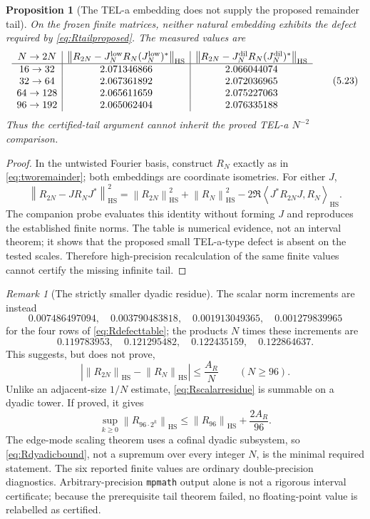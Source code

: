 \documentclass[11pt]{article}
\newtheorem{proposition}[theorem]{Proposition}
\theoremstyle{remark}
\newtheorem{remark}[theorem]{Remark}
\newcommand{\HS}{\mathrm{HS}}
\newcommand{\norm}[1]{\left\lVert#1\right\rVert}
\newcommand{\ip}[2]{\left\langle#1,#2\right\rangle}
\begin{document}
\begin{proposition}[The TEL-a embedding does not supply the proposed
remainder tail]\label{prop:tailfailure}
On the frozen finite matrices, neither natural embedding exhibits the
defect required by \eqref{eq:Rtailproposed}.  The measured values are
\[
\begin{array}{c|c|c}
N\to2N&
\norm{R_{2N}-J_N^{\rm low}R_N(J_N^{\rm low})^*}_{\HS}&
\norm{R_{2N}-J_N^{\rm dil}R_N(J_N^{\rm dil})^*}_{\HS}\\ \hline
16\to32&2.071346866&2.066044074\\
32\to64&2.067361892&2.072036965\\
64\to128&2.065611659&2.075227063\\
96\to192&2.065062404&2.076335188
\end{array}
\tag{5.23}\label{eq:Rdefecttable}
\]
Thus the certified-tail argument cannot inherit the proved TEL-a
$N^{-2}$ comparison.
\end{proposition}

\begin{proof}
In the untwisted Fourier basis, construct $R_N$ exactly as in
\eqref{eq:tworemainder}; both embeddings are coordinate isometries.
For either $J$,
\[
 \norm{R_{2N}-JR_NJ^*}_{\HS}^2
 =\norm{R_{2N}}_{\HS}^2+\norm{R_N}_{\HS}^2
 -2\Re\ip{J^*R_{2N}J}{R_N}_{\HS}.
\]
The companion probe evaluates this identity without forming $J$ and
reproduces the established finite norms.  The table is numerical
evidence, not an interval theorem; it shows that the proposed small
TEL-a-type defect is absent on the tested scales.  Therefore
high-precision recalculation of the same finite values cannot certify
the missing infinite tail.
\end{proof}

\begin{remark}[The strictly smaller dyadic residue]
The scalar norm increments are instead
\[
 0.007486497094,\quad0.003790483818,\quad
 0.001913049365,\quad0.001279839965
\]
for the four rows of \eqref{eq:Rdefecttable}; the products $N$ times
these increments are
\[
 0.119783953,\quad0.121295482,\quad
 0.122435159,\quad0.122864637.
\]
This suggests, but does not prove,
\[
 \left|\norm{R_{2N}}_{\HS}-\norm{R_N}_{\HS}\right|
 \le\frac{A_R}{N}\qquad(N\ge96).
\tag{5.24}\label{eq:Rscalarresidue}
\]
Unlike an adjacent-size $1/N$ estimate, \eqref{eq:Rscalarresidue} is
summable on a dyadic tower.  If proved, it gives
\[
 \sup_{k\ge0}\norm{R_{96\cdot2^k}}_{\HS}
 \le\norm{R_{96}}_{\HS}+\frac{2A_R}{96}.
\tag{5.25}\label{eq:Rdyadicbound}
\]
The edge-mode scaling theorem uses a cofinal dyadic subsystem, so
\eqref{eq:Rdyadicbound}, not a supremum over every integer $N$, is the
minimal required statement.  The six reported finite values are
ordinary double-precision diagnostics.  Arbitrary-precision
\texttt{mpmath} output alone is not a rigorous interval certificate;
because the prerequisite tail theorem failed, no floating-point value
is relabelled as certified.
\end{remark}
\end{document}

